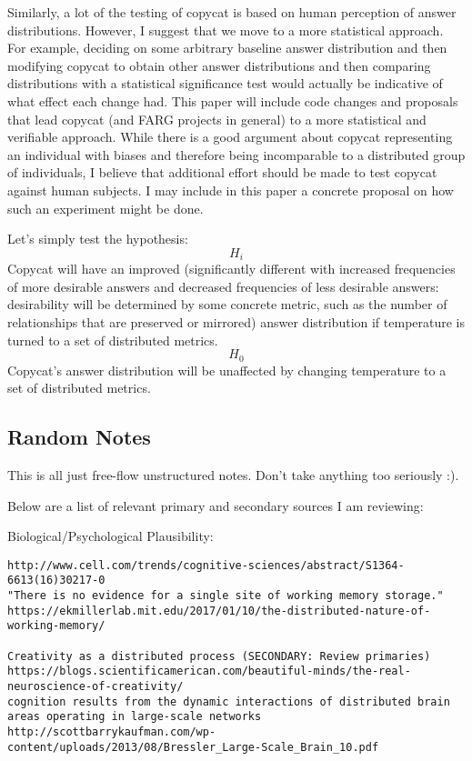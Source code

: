 \documentclass[a4paper]{article}
\begin{document}
Similarly, a lot of the testing of copycat is based on human perception of answer distributions. However, I suggest that we move to a more statistical approach. For example, deciding on some arbitrary baseline answer distribution and then modifying copycat to obtain other answer distributions and then comparing distributions with a statistical significance test would actually be indicative of what effect each change had. This paper will include code changes and proposals that lead copycat (and FARG projects in general) to a more statistical and verifiable approach.
While there is a good argument about copycat representing an individual with biases and therefore being incomparable to a distributed group of individuals, I believe that additional effort should be made to test copycat against human subjects.  I may include in this paper a concrete proposal on how such an experiment might be done.

Let's simply test the hypothesis: \[H_i\] Copycat will have an improved (significantly different with increased frequencies of more desirable answers and decreased frequencies of less desirable answers: desirability will be determined by some concrete metric, such as the number of relationships that are preserved or mirrored) answer distribution if temperature is turned to a set of distributed metrics. \[H_0\] Copycat's answer distribution will be unaffected by changing temperature to a set of distributed metrics.

\subsection{Random Notes}

This is all just free-flow unstructured notes. Don't take anything too seriously :).

Below are a list of relevant primary and secondary sources I am reviewing:

Biological/Psychological Plausibility:
\begin{verbatim}
http://www.cell.com/trends/cognitive-sciences/abstract/S1364-6613(16)30217-0
"There is no evidence for a single site of working memory storage."
https://ekmillerlab.mit.edu/2017/01/10/the-distributed-nature-of-working-memory/

Creativity as a distributed process (SECONDARY: Review primaries)
https://blogs.scientificamerican.com/beautiful-minds/the-real-neuroscience-of-creativity/
cognition results from the dynamic interactions of distributed brain areas operating in large-scale networks
http://scottbarrykaufman.com/wp-content/uploads/2013/08/Bressler_Large-Scale_Brain_10.pdf

\end{verbatim}




\end{document}
